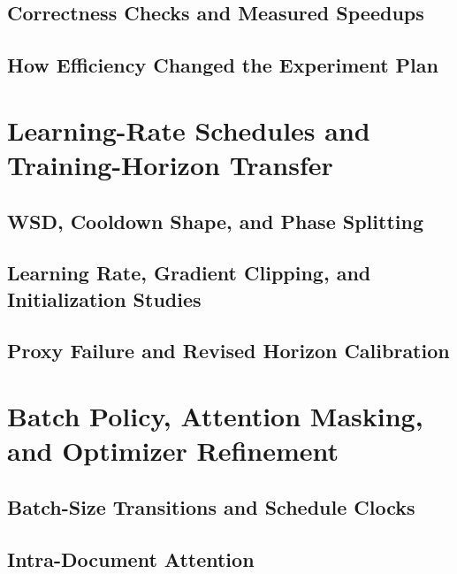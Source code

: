 \subsection{Correctness Checks and Measured Speedups}
\subsection{How Efficiency Changed the Experiment Plan}

\section{Learning-Rate Schedules and Training-Horizon Transfer}
\label{sec:schedules}
\subsection{WSD, Cooldown Shape, and Phase Splitting}
\subsection{Learning Rate, Gradient Clipping, and Initialization Studies}
\subsection{Proxy Failure and Revised Horizon Calibration}

\section{Batch Policy, Attention Masking, and Optimizer Refinement}
\label{sec:refinement}
\subsection{Batch-Size Transitions and Schedule Clocks}
\subsection{Intra-Document Attention}
